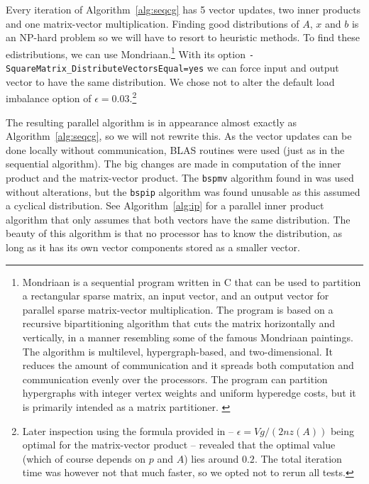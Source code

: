 \documentclass[11pt]{amsart}
\theoremstyle{definition}
\begin{document}
Every iteration of Algorithm~\ref{alg:seqcg} has 5 vector updates, two inner products and one matrix-vector multiplication. Finding good distributions of $A$, $x$ and $b$ is an NP-hard problem so we will have to resort to heuristic methods. To find these edistributions, we can use Mondriaan.\footnote{Mondriaan is a sequential program written in C that can be used to partition a rectangular sparse matrix, an input vector, and an output vector for parallel sparse matrix-vector multiplication. The program is based on a recursive bipartitioning algorithm that cuts the matrix horizontally and vertically, in a manner resembling some of the famous Mondriaan paintings. The algorithm is multilevel, hypergraph-based, and two-dimensional. It reduces the amount of communication and it spreads both computation and communication evenly over the processors. The program can partition hypergraphs with integer vertex weights and uniform hyperedge costs, but it is primarily intended as a matrix partitioner. \cite{mondriaan}} With its option \texttt{-SquareMatrix\_DistributeVectorsEqual=yes} we can force input and output vector to have the same distribution. We chose not to alter the default load imbalance option of $\epsilon = 0.03$.\footnote{Later inspection using the formula provided in \cite[p.~189]{biss04} -- $\epsilon = Vg/(2nz(A))$ being optimal for the matrix-vector product -- revealed that the optimal value (which of course depends on $p$ and $A$) lies around $0.2$. The total iteration time was however not that much faster, so we opted not to rerun all tests.}

The resulting parallel algorithm is in appearance almost exactly as Algorithm~\ref{alg:seqcg}, so we will not rewrite this. As the vector updates can be done locally without communication, BLAS routines were used (just as in the sequential algorithm). The big changes are made in computation of the inner product and the matrix-vector product. The \texttt{bspmv} algorithm found in \cite[Alg.~4.5]{biss04} was used without alterations, but the \texttt{bspip} algorithm \cite[Alg.~1.1]{biss04} was found unusable as this assumed a cyclical distribution. See Algorithm~\ref{alg:ip} for a parallel inner product algorithm that only assumes that both vectors have the same distribution. The beauty of this algorithm is that no processor has to know the distribution, as long as it has its own vector components stored as a smaller vector.
\end{document}
